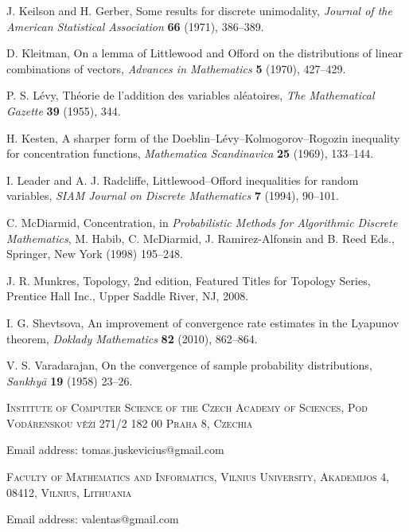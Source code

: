 \documentclass{article}
\begin{document}
\begin{thebibliography}{21}
 J. Keilson and H. Gerber, Some results for discrete unimodality, \emph{Journal of the American Statistical Association} \textbf{66} (1971), 386--389.

 D. Kleitman, On a lemma of Littlewood and Offord on the distributions of linear combinations of vectors, \emph{Advances in Mathematics} \textbf{5} (1970), 427--429.

 P. S. L\'{e}vy, Théorie de l'addition des variables aléatoires, \emph{The Mathematical Gazette}  \textbf{39} (1955), 344.



 H. Kesten, A sharper form of the Doeblin--L\'{e}vy--Kolmogorov--Rogozin inequality for concentration functions, \emph{Mathematica Scandinavica} \textbf{25} (1969), 133--144.


 I. Leader and A. J. Radcliffe, Littlewood--Offord inequalities for random variables, \emph{SIAM Journal on Discrete Mathematics} \textbf{7} (1994), 90--101.

 C. McDiarmid, Concentration, in \textit{Probabilistic Methods for Algorithmic Discrete Mathematics}, M. Habib, C. McDiarmid, J. Ramirez-Alfonsin and B. Reed Eds., Springer, New York (1998) 195--248.

 J. R. Munkres, Topology, 2nd edition, Featured Titles for Topology Series, Prentice Hall Inc., Upper Saddle River, NJ, 2008.

 I. G. Shevtsova, An improvement of convergence rate estimates in the Lyapunov theorem, \emph{Doklady Mathematics} \textbf{82} (2010), 862--864.

 V. S. Varadarajan, On the convergence of sample probability distributions, \emph{Sankhyā} \textbf{19} (1958) 23--26. 

\end{thebibliography}


\bigskip

\textsc{Institute of Computer Science of the Czech Academy of Sciences, Pod Vodárenskou věží 271/2
182 00 Praha 8, Czechia}

Email address: tomas.juskevicius@gmail.com

\bigskip


\textsc{Faculty of Mathematics and Informatics, Vilnius University, Akademijos 4, 08412, Vilnius, Lithuania}

Email address: valentas@gmail.com
\end{document}
